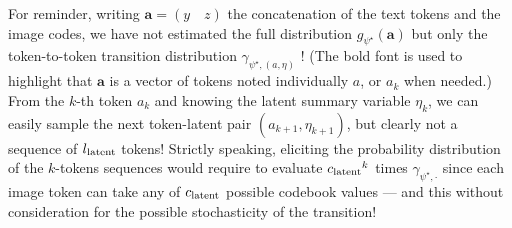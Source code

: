 \documentclass{article}
\begin{document}
\begin{multicols}{2}
For reminder, writing $\mathbf{a}=(y \quad z)$ the concatenation of the text tokens and the image codes, we have not estimated the full distribution $g_{\psi^\star}(\mathbf{a})$ but only the token-to-token transition distribution $\gamma_{\psi^\star,(a,\eta)}$ ! (The bold font is used to highlight that $\mathbf{a}$ is a vector of tokens noted individually $a$, or $a_k$ when needed.) From the $k$-th token $a_k$ and knowing the latent summary variable $\eta_k$, we can easily sample the next token-latent pair $(a_{k+1},\eta_{k+1})$, but clearly not a sequence of ${l_{\mathrm{latent}}}$ tokens! Strictly speaking, eliciting the probability distribution of the $k$-tokens sequences would require to evaluate ${c_{\mathrm{latent}}}^k$ times $\gamma_{\psi^\star,\cdot}$ since each image token can take any of ${c_{\mathrm{latent}}}$ possible codebook values — and this without consideration for the possible stochasticity of the transition!


\end{multicols}
\end{document}

